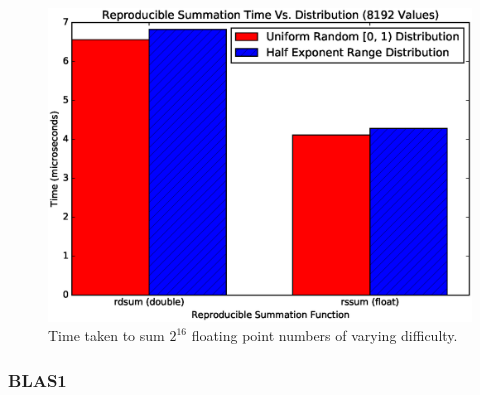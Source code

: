  \begin{figure}[H]
  \begin{center}
  \includegraphics[width=\textwidth]{plots/easy_vs_hard}
  \caption{Time taken to sum $2^{16}$ floating point numbers of varying difficulty.}
  \label{fig:easy_vs_hard_timings}
  \end{center}
  \end{figure}
  \subsubsection{BLAS1}

